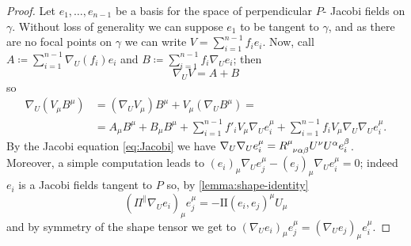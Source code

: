 \begin{proof}
	Let \(e_1, \ldots, e_{n - 1}\) be a basis for the space of perpendicular \(P\)- Jacobi fields on \(\gamma\). Without loss of generality we can suppose \(e_1\) to be tangent to \(\gamma\), and as there are no focal points on \(\gamma\) we can write \(V = \sum_{i = 1}^{n - 1} f_ie_i\).
	Now, call \(A \coloneqq \sum_{i = 1}^{n - 1} \nabla_U(f_i)e_i\) and \(B \coloneqq \sum_{i = 1}^{n - 1} f_i\nabla_Ue_i\); then
	\[
	\nabla_UV = A + B
	\]
	so
	\begin{align*}
		\nabla_U(V_{\mu}B^{\mu}) &= (\nabla_UV_{\mu})B^{\mu} + V_{\mu}(\nabla_UB^{\mu}) = \\
		 &= A_{\mu}B^{\mu} + B_{\mu}B^{\mu} + \sum_{i = 1}^{n - 1}f'_iV_{\mu}\nabla_Ue_i^{\mu} + \sum_{i = 1}^{n - 1}f_iV_{\mu}\nabla_U\nabla_Ue_i^{\mu}.
	\end{align*}
	By the Jacobi equation \eqref{eq:Jacobi} we have \(\nabla_U\nabla_Ue_i^{\mu} = R\indices{^{\mu}_{\nu\alpha\beta}}U^{\nu}U^{\alpha}e_i^{\beta}\). Moreover, a simple computation leads to \((e_i)_{\mu}\nabla_Ue_j^{\mu} - (e_j)_{\mu}\nabla_Ue_i^{\mu} = 0\); indeed \(e_i\) is  a Jacobi fields tangent to \(P\) so, by \ref{lemma:shape-identity}
	\[
	(\Pi^{\parallel}\nabla_Ue_i)_{\mu}e_j^{\mu} = - \mathrm{I\!I}(e_i, e_j)^{\mu}U_{\mu}
	\]
	and by symmetry of the shape tensor we get to \((\nabla_Ue_i)_{\mu}e_j^{\mu} = (\nabla_Ue_j)_{\mu}e_i^{\mu}\). 
	

\end{proof}
